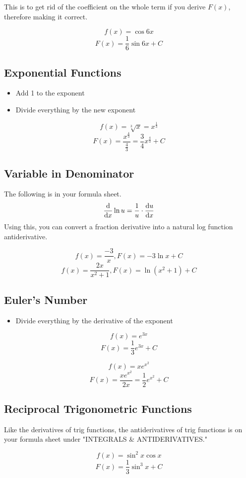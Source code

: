 \documentclass[a4paper,12pt]{article}
\begin{document}
This is to get rid of the coefficient on the whole term if you derive $F(x)$, therefore making it correct.

$$f(x) = \cos{6x}$$
$$F(x) = \frac{1}{6}\sin{6x} + C$$

\subsection{Exponential Functions}
\begin{itemize}
    \item{Add 1 to the exponent}
    \item{Divide everything by the new exponent}
\end{itemize}

$$f(x) = \sqrt[3]{x} = x^{\frac{1}{3}}$$
$$F(x) = \frac{x^{\frac{4}{3}}}{\frac{4}{3}} = \frac{3}{4}x^{\frac{4}{3}} + C$$

\subsection{Variable in Denominator}
The following is in your formula sheet.
$$\dv{}{x}\ln{u} = \frac{1}{u} \cdot \dv{u}{x}$$
Using this, you can convert a fraction derivative into a natural log function antiderivative.

$$f(x) = \frac{-3}{x}, F(x) = -3\ln{x} + C$$
$$f(x) = \frac{2x}{x^2 + 1}, F(x) = \ln{(x^2 + 1)} + C$$

\subsection{Euler's Number}
\begin{itemize}
    \item{Divide everything by the derivative of the exponent}
\end{itemize}

$$f(x) = e^{3x}$$
$$F(x) = \frac{1}{3}e^{3x} + C$$

$$f(x) = xe^{x^2}$$
$$F(x) = \frac{xe^{x^2}}{2x} = \frac{1}{2}e^{x^2} + C$$

\subsection{Reciprocal Trigonometric Functions}
Like the derivatives of trig functions, the antiderivatives of trig functions is on your formula sheet under "INTEGRALS \& ANTIDERIVATIVES."

$$f(x) = \sin^2{x}\cos{x}$$
$$F(x) = \frac{1}{3}\sin^3{x} + C$$
\end{document}
